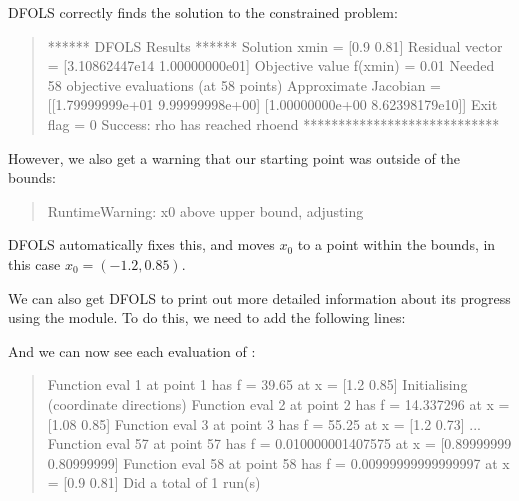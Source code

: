 \documentclass[letterpaper,10pt,english]{sphinxmanual}
\begin{document}
DFO\sphinxhyphen{}LS correctly finds the solution to the constrained problem:
\begin{quote}

\begin{sphinxVerbatim}[commandchars=\\\{\}]
****** DFO\PYGZhy{}LS Results ******
Solution xmin = [0.9  0.81]
Residual vector = [3.10862447e\PYGZhy{}14 1.00000000e\PYGZhy{}01]
Objective value f(xmin) = 0.01
Needed 58 objective evaluations (at 58 points)
Approximate Jacobian = [[\PYGZhy{}1.79999999e+01  9.99999998e+00]
 [\PYGZhy{}1.00000000e+00  8.62398179e\PYGZhy{}10]]
Exit flag = 0
Success: rho has reached rhoend
****************************
\end{sphinxVerbatim}
\end{quote}

However, we also get a warning that our starting point was outside of the bounds:
\begin{quote}

\begin{sphinxVerbatim}[commandchars=\\\{\}]
RuntimeWarning: x0 above upper bound, adjusting
\end{sphinxVerbatim}
\end{quote}

DFO\sphinxhyphen{}LS automatically fixes this, and moves \(x_0\) to a point within the bounds, in this case \(x_0=(-1.2,0.85)\).

We can also get DFO\sphinxhyphen{}LS to print out more detailed information about its progress using the  module. To do this, we need to add the following lines:
\begin{quote}

\begin{sphinxVerbatim}[commandchars=\\\{\}]
 
 

\end{sphinxVerbatim}
\end{quote}

And we can now see each evaluation of :
\begin{quote}

\begin{sphinxVerbatim}[commandchars=\\\{\}]
Function eval 1 at point 1 has f = 39.65 at x = [\PYGZhy{}1.2   0.85]
Initialising (coordinate directions)
Function eval 2 at point 2 has f = 14.337296 at x = [\PYGZhy{}1.08  0.85]
Function eval 3 at point 3 has f = 55.25 at x = [\PYGZhy{}1.2   0.73]
...
Function eval 57 at point 57 has f = 0.010000001407575 at x = [0.89999999 0.80999999]
Function eval 58 at point 58 has f = 0.00999999999999997 at x = [0.9  0.81]
Did a total of 1 run(s)
\end{sphinxVerbatim}
\end{quote}
\end{document}
